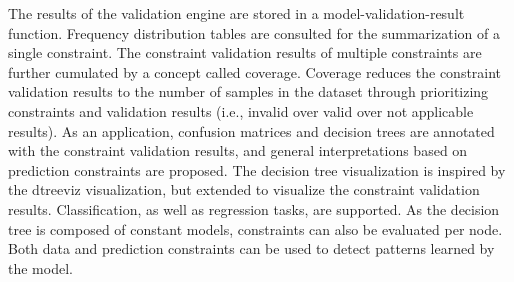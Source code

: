 The results of the validation engine are stored in a model-validation-result function. Frequency distribution tables are consulted for the summarization of a single constraint. The constraint validation results of multiple constraints are further cumulated by a concept called coverage. Coverage reduces the constraint validation results to the number of samples in the dataset through prioritizing constraints and validation results (i.e., invalid over valid over not applicable results). As an application, confusion matrices and decision trees are annotated with the constraint validation results, and general interpretations based on prediction constraints are proposed. The decision tree visualization is inspired by the dtreeviz visualization, but extended to visualize the constraint validation results. Classification, as well as regression tasks, are supported. As the decision tree is composed of constant models, constraints can also be evaluated per node. Both data and prediction constraints can be used to detect patterns learned by the model. 